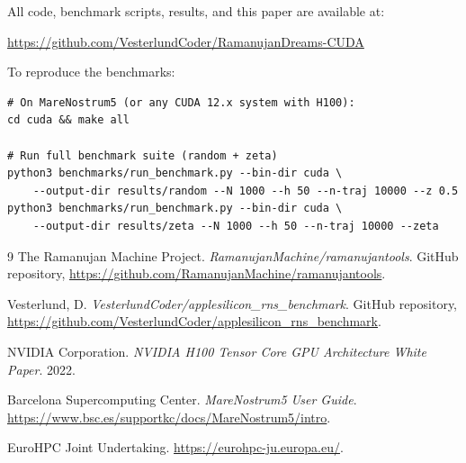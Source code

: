 \documentclass[11pt,a4paper]{article}
\begin{document}
All code, benchmark scripts, results, and this paper are available at:
\begin{center}
\url{https://github.com/VesterlundCoder/RamanujanDreams-CUDA}
\end{center}

To reproduce the benchmarks:
\begin{verbatim}
# On MareNostrum5 (or any CUDA 12.x system with H100):
cd cuda && make all

# Run full benchmark suite (random + zeta)
python3 benchmarks/run_benchmark.py --bin-dir cuda \
    --output-dir results/random --N 1000 --h 50 --n-traj 10000 --z 0.5
python3 benchmarks/run_benchmark.py --bin-dir cuda \
    --output-dir results/zeta --N 1000 --h 50 --n-traj 10000 --zeta
\end{verbatim}

\begin{thebibliography}{9}
The Ramanujan Machine Project.
\textit{RamanujanMachine/ramanujantools}.
GitHub repository, \url{https://github.com/RamanujanMachine/ramanujantools}.

\bibitem{rns-benchmark}
Vesterlund, D.
\textit{VesterlundCoder/applesilicon\_rns\_benchmark}.
GitHub repository, \url{https://github.com/VesterlundCoder/applesilicon_rns_benchmark}.

\bibitem{h100}
NVIDIA Corporation.
\textit{NVIDIA H100 Tensor Core GPU Architecture White Paper}.
2022.

Barcelona Supercomputing Center.
\textit{MareNostrum5 User Guide}.
\url{https://www.bsc.es/supportkc/docs/MareNostrum5/intro}.

EuroHPC Joint Undertaking.
\url{https://eurohpc-ju.europa.eu/}.
\end{thebibliography}
\end{document}
